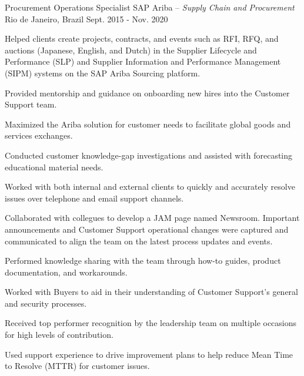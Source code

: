 


\begin{cventries}


\cventry
{Procurement Operations Specialist} %
{SAP Ariba \textmd{-- \em{Supply Chain and Procurement}}} %
{Rio de Janeiro, Brazil} %
{Sept. 2015 - Nov. 2020} %
{ %
\begin{cvitems}
\item {Helped clients create projects, contracts, and events such as RFI, RFQ, and auctions (Japanese, English, and Dutch) in the Supplier Lifecycle and Performance (SLP) and Supplier Information and Performance Management (SIPM) systems on the SAP Ariba Sourcing platform.}
\item {Provided mentorship and guidance on onboarding new hires into the Customer Support team.}
\item {Maximized the Ariba solution for customer needs to facilitate global goods and services exchanges.}
\item {Conducted customer knowledge-gap investigations and assisted with forecasting educational material needs.}
\item {Worked with both internal and external clients to quickly and accurately resolve issues over telephone and email support channels.}
\item {Collaborated with collegues to develop a JAM page named Newsroom. Important announcements and Customer Support operational changes were captured and communicated to align the team on the latest process updates and events.}
\item {Performed knowledge sharing with the team through how-to guides, product documentation, and workarounds.}
\item {Worked with Buyers to aid in their understanding of Customer Support's general and security processes.}
\item {Received top performer recognition by the leadership team on multiple occasions for high levels of contribution.}
\item {Used support experience to drive improvement plans to help reduce Mean Time to Resolve (MTTR) for customer issues.}
\end{cvitems}
}


\end{cventries}
